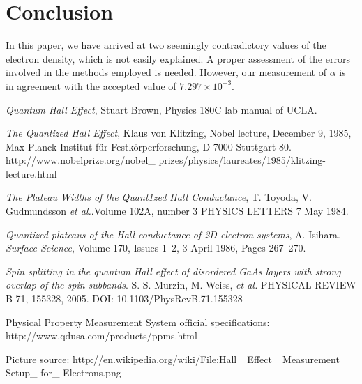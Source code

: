 \documentclass[aps,prl,nofootinbib,twocolumn,superscriptaddress,groupedaddress]{revtex4}  %
\begin{document}
\section{Conclusion}
In this paper, we have arrived at two seemingly contradictory values of the electron density, which is not easily explained. A proper assessment of the errors involved in the methods employed is needed. However, our measurement of $\alpha$ is in agreement with the accepted value of $7.297 \times 10^{-3}$.
\begin{thebibliography}{2}

    \textit{Quantum Hall Effect}, Stuart Brown, Physics 180C lab manual of UCLA.

    \textit{The Quantized Hall Effect}, Klaus von Klitzing, Nobel lecture, December 9, 1985, Max-Planck-Institut für Festkörperforschung, D-7000 Stuttgart 80. http://www.nobelprize.org/nobel\_ prizes/physics/laureates/1985/klitzing-lecture.html

    \textit{The Plateau Widths of the Quant1zed Hall Conductance}, T. Toyoda, V. Gudmundsson \textit{et al.}.Volume 102A, number 3 PHYSICS LETTERS 7 May 1984.
    
    \textit{Quantized plateaus of the Hall conductance of 2D electron systems}, A. Isihara. \textsl{Surface Science}, Volume 170, Issues 1–2, 3 April 1986, Pages 267–270.
    
    \textit{Spin splitting in the quantum Hall effect of disordered GaAs layers with strong overlap
of the spin subbands}. S. S. Murzin, M. Weiss, \textit{et al.} PHYSICAL REVIEW B 71, 155328, 2005. DOI: 10.1103/PhysRevB.71.155328 

    Physical Property Measurement System official specifications: http://www.qdusa.com/products/ppms.html
    
    Picture source: http://en.wikipedia.org/wiki/File:Hall\_ Effect\_ Measurement\_ Setup\_ for\_ Electrons.png
\end{thebibliography}
\end{document}
